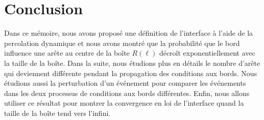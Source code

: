 \documentclass[titlepage,a4paper,12pt]{article}
\newcounter{prop}
\begin{document}
\section{Conclusion}

Dans ce mémoire, nous avons proposé une définition de l'interface à l'aide de la percolation dynamique et nous avons montré que la probabilité que le bord influence une arête au centre de la boîte $R(\ell)$ décroît exponentiellement avec la taille de la boîte. Dans la suite, nous étudions plus en détails le nombre d'arête qui deviennent différente pendant la propagation des conditions aux bords. Nous étudions aussi la perturbation d'un événement pour comparer les événements dans les deux processus de conditions aux bords différentes. Enfin, nous allons utiliser ce résultat pour montrer la convergence en loi de l'interface quand la taille de la boîte tend vers l'infini.
\nocite{*}


\end{document}
